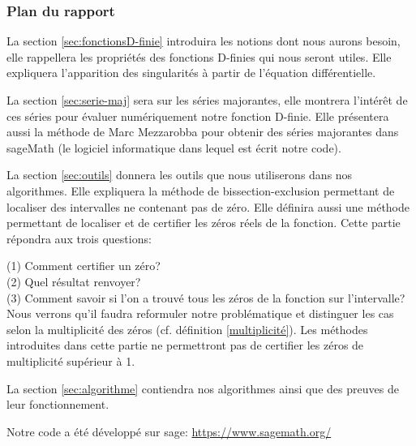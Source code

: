 \documentclass[a4paper,10pt]{article}
\begin{document}
	\subsubsection{Plan du rapport}
	\label{subsubplanrapport}
	La section \ref{sec:fonctionsD-finie} introduira les notions dont nous aurons besoin, elle rappellera les propriétés des fonctions D-finies qui nous seront utiles. Elle expliquera l'apparition des singularités à partir de l'équation différentielle.
	
 	La section \ref{sec:serie-maj} sera sur les séries majorantes, elle montrera l'intérêt de ces séries pour évaluer numériquement notre fonction D-finie. Elle présentera aussi la méthode de Marc Mezzarobba \cite{Mezzarobba2019} pour obtenir des séries majorantes dans sageMath (le logiciel informatique dans lequel est écrit notre code).
 	
	La section \ref{sec:outils} donnera les outils que nous utiliserons dans nos algorithmes. Elle expliquera la méthode de bissection-exclusion \cite{DBLP:journals/jc/Yakoubsohn05} permettant de localiser des intervalles ne contenant pas de zéro. Elle définira aussi une méthode permettant de localiser et de certifier les zéros réels de la fonction. Cette partie répondra aux trois questions:
	
		(1) Comment certifier un zéro? \\
		
		(2) Quel résultat renvoyer?\\
		
		(3) Comment savoir si l'on a trouvé tous les zéros de la fonction sur l'intervalle?\\

	Nous verrons qu'il faudra reformuler notre problématique et distinguer les cas selon la multiplicité des zéros (cf. définition \ref{multiplicité}). Les méthodes introduites dans cette partie ne permettront pas de certifier les zéros de multiplicité supérieur à 1.
	
	La section \ref{sec:algorithme} contiendra nos algorithmes ainsi que des preuves de leur fonctionnement.
	
	Notre code a été développé sur sage: \url{https://www.sagemath.org/}
	
\end{document}
